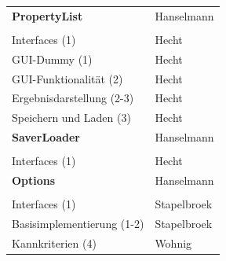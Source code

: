 \documentclass[a4paper]{scrreprt}
\begin{document}
\begin{tabular}{ | p{7cm} | p{7cm} |}
	\rule{0pt}{15pt}\textbf {PropertyList} & Hanselmann\\
	&\\
	\hline
	Interfaces (1) & Hecht\\
	\hline
	GUI-Dummy (1) & Hecht\\
	\hline
	GUI-Funktionalität (2) & Hecht\\
	\hline
	Ergebnisdarstellung (2-3) & Hecht\\
	\hline
	Speichern und Laden (3) & Hecht\\
	\hline
	\rule{0pt}{15pt}\textbf {SaverLoader} & Hanselmann\\
	&\\
	\hline
	Interfaces (1) & Hecht\\
	\hline
	\rule{0pt}{15pt}\textbf {Options} & Hanselmann\\
	&\\
	\hline
	Interfaces (1) & Stapelbroek\\
	\hline
	Basisimplementierung (1-2) & Stapelbroek\\
	\hline
	Kannkriterien (4) & Wohnig \\
	\hline
	
\end{tabular}\\
\end{document}
